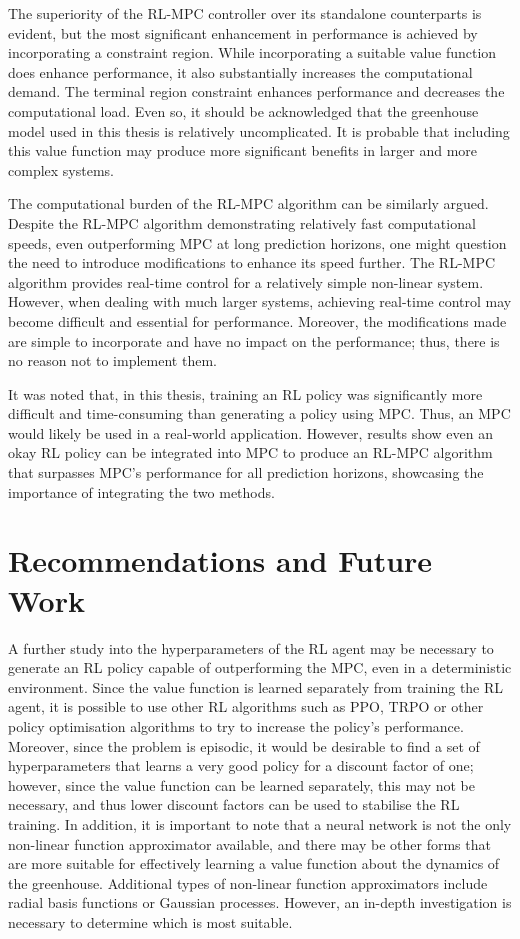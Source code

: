 The superiority of the RL-MPC controller over its standalone counterparts is evident, but the most significant enhancement in performance is achieved by incorporating a constraint region. While incorporating a suitable value function does enhance performance, it also substantially increases the computational demand. The terminal region constraint enhances performance and decreases the computational load. Even so, it should be acknowledged that the greenhouse model used in this thesis is relatively uncomplicated. It is probable that including this value function may produce more significant benefits in larger and more complex systems.

The computational burden of the RL-MPC algorithm can be similarly argued. Despite the RL-MPC algorithm demonstrating relatively fast computational speeds, even outperforming MPC at long prediction horizons, one might question the need to introduce modifications to enhance its speed further. The RL-MPC algorithm provides real-time control for a relatively simple non-linear system. However, when dealing with much larger systems, achieving real-time control may become difficult and essential for performance. Moreover, the modifications made are simple to incorporate and have no impact on the performance; thus, there is no reason not to implement them.

It was noted that, in this thesis, training an RL policy was significantly more difficult and time-consuming than generating a policy using MPC. Thus, an MPC would likely be used in a real-world application. However, results show even an okay RL policy can be integrated into MPC to produce an RL-MPC algorithm that surpasses MPC’s performance for all prediction horizons, showcasing the importance of integrating the two methods.


\section{Recommendations and Future Work}
A further study into the hyperparameters of the RL agent may be necessary to generate an RL policy capable of outperforming the MPC, even in a deterministic environment. Since the value function is learned separately from training the RL agent, it is possible to use other RL algorithms such as PPO, TRPO or other policy optimisation algorithms to try to increase the policy's performance. Moreover, since the problem is episodic, it would be desirable to find a set of hyperparameters that learns a very good policy for a discount factor of one; however, since the value function can be learned separately, this may not be necessary, and thus lower discount factors can be used to stabilise the RL training. In addition, it is important to note that a neural network is not the only non-linear function approximator available, and there may be other forms that are more suitable for effectively learning a value function about the dynamics of the greenhouse. Additional types of non-linear function approximators include radial basis functions or Gaussian processes. However, an in-depth investigation is necessary to determine which is most suitable.

